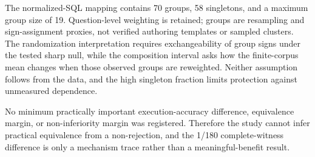 \documentclass[applsci,article,submit,moreauthors]{Definitions/mdpi}
\begin{document}
\begin{table}[htbp]
\caption{Complete primary factorial family for strict execution equality. Estimates are question-weighted finite-set differences; intervals are 95\% normalized-SQL-group composition-sensitivity intervals. Each sign-randomization used 70 groups, 100,000 draws, and the displayed raw values were Holm-adjusted jointly over all nine rows.}
\label{tab:factorial-nine}\centering\scriptsize
{}
\end{table}

The normalized-SQL mapping contains 70 groups, 58 singletons, and a maximum group size of 19. Question-level weighting is retained; groups are resampling and sign-assignment proxies, not verified authoring templates or sampled clusters. The randomization interpretation requires exchangeability of group signs under the tested sharp null, while the composition interval asks how the finite-corpus mean changes when those observed groups are reweighted. Neither assumption follows from the data, and the high singleton fraction limits protection against unmeasured dependence.

No minimum practically important execution-accuracy difference, equivalence margin, or non-inferiority margin was registered. Therefore the study cannot infer practical equivalence from a non-rejection, and the 1/180 complete-witness difference is only a mechanism trace rather than a meaningful-benefit result.
\end{document}
